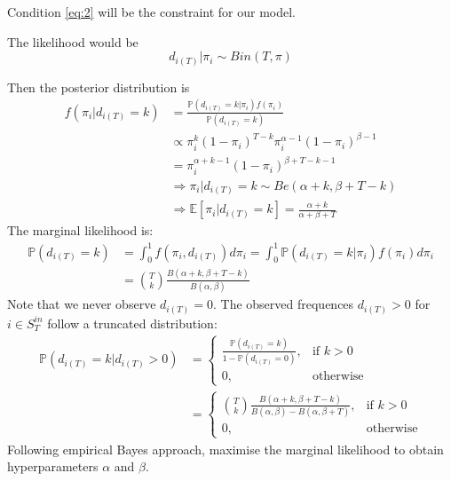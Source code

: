 \documentclass[a4paper, 12pt]{article}
\begin{document}
\begin{itemize}
    Condition \eqref{eq:2} will be the constraint for our model.
    
    The likelihood would be
    \begin{equation*}
        d_{i(T)} |\pi_i \sim Bin(T, \pi)
    \end{equation*}
    
    Then the posterior distribution is
    \begin{align*}
        f(\pi_i | d_{i(T)} = k) &= \frac{\mathbb{P}(d_{i(T)} = k | \pi_i) f(\pi_i)}{\mathbb{P}(d_{i(T)} = k)} \\
        &\propto \pi_i^k(1 - \pi_i)^{T - k}\pi_i^{\alpha - 1}(1 - \pi_i)^{\beta - 1}\\
        &= \pi_i^{\alpha + k - 1}(1 - \pi_i)^{\beta + T - k - 1}\\
        &\Rightarrow \pi_i | d_{i(T)} = k \sim Be(\alpha + k, \beta + T - k)\\
        &\Rightarrow \mathbb{E}[\pi_i|d_{i(T)} = k] = \frac{\alpha + k}{\alpha + \beta + T}
    \end{align*}
    The marginal likelihood is:
    \begin{align*}
        \mathbb{P}(d_{i(T)} = k) &= \int_0^1 f(\pi_i, d_{i(T)})d\pi_i = \int_0^1 \mathbb{P}(d_{i(T)} = k | \pi_i)f(\pi_i)d\pi_i\\
        &= \binom{T}{k} \frac{B(\alpha + k, \beta + T - k)}{B(\alpha, \beta)}
    \end{align*}
    Note that we never observe $d_{i(T)} = 0$. The observed frequences $d_{i(T)} > 0$ for $i \in S_{T}^{in}$ follow a truncated distribution:
    \begin{align*}
    \mathbb{P}(d_{i(T)} = k | d_{i(T)} > 0) &= 
    \begin{cases}
        \frac{\mathbb{P}(d_{i(T)} = k)}{1 - \mathbb{P}(d_{i(T)} = 0)},& \text{if } k > 0 \\
        0, & \text{otherwise}
    \end{cases}\\
    &=
    \begin{cases}
        \binom{T}{k} \frac{B(\alpha + k, \beta + T - k)}{B(\alpha, \beta) - B(\alpha, \beta + T)},& \text{if } k > 0 \\
        0, & \text{otherwise}
    \end{cases}
    \end{align*}
    Following empirical Bayes approach, maximise the marginal likelihood to obtain hyperparameters $\alpha$ and $\beta$.
    \begin{align} \label{eq:3}

\end{align}
\end{itemize}
\end{document}
